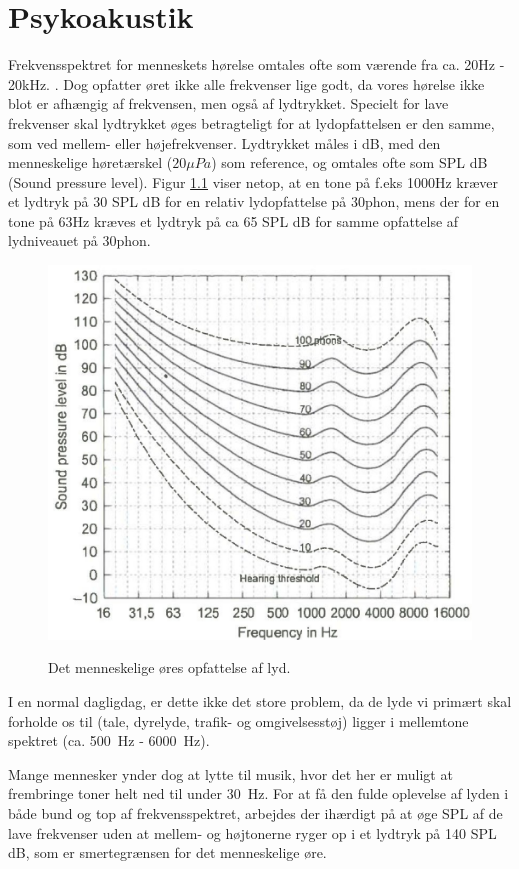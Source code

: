 \chapter{Psykoakustik}

Frekvensspektret for menneskets hørelse omtales ofte som værende fra ca. 20Hz - 20kHz. \cite{Elektroakustik}. Dog opfatter øret ikke alle frekvenser lige godt, da vores hørelse ikke blot er afhængig af frekvensen, men også af lydtrykket. Specielt for lave frekvenser skal lydtrykket øges betragteligt for at lydopfattelsen er den samme, som ved mellem- eller højefrekvenser. Lydtrykket måles i dB, med den menneskelige høretærskel ($20\mu Pa$)  som reference, og omtales ofte som SPL dB (Sound pressure level). Figur \ref{fig:SPL} viser netop, at en tone på f.eks 1000Hz kræver et lydtryk på 30 SPL dB for en relativ lydopfattelse på 30phon, mens der for en tone på 63Hz kræves et lydtryk på ca 65 SPL dB for samme opfattelse af lydniveauet på 30phon.

\begin{figure}[h!]
	\centering
	\includegraphics[width=.6\textwidth]{Pics/SPL.PNG}
	\label{fig:SPL}
	\caption{Det menneskelige øres opfattelse af lyd. \cite{Elektroakustik}}
\end{figure}

I en normal dagligdag, er dette ikke det store problem, da de lyde vi primært skal forholde os til (tale, dyrelyde, trafik- og omgivelsesstøj) ligger i mellemtone spektret (ca. \SI{500}{\hertz} - \SI{6000}{\hertz}). 

Mange mennesker ynder dog at lytte til musik, hvor det her er muligt at frembringe toner helt ned til under \SI{30}{\hertz}. For at få den fulde oplevelse af lyden i både bund og top af frekvensspektret, arbejdes der ihærdigt på at øge SPL af de lave frekvenser uden at mellem- og højtonerne ryger op i et lydtryk på 140 SPL dB, som er smertegrænsen for det menneskelige øre.